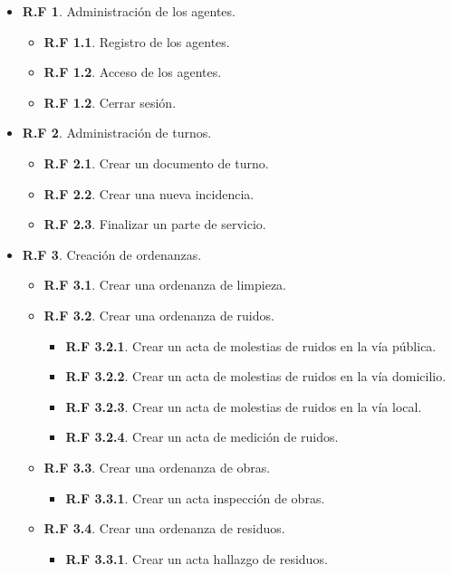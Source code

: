 \begin{itemize}
	
	\item \textbf{R.F 1}. Administración de los agentes.
	\begin{itemize}
		\item \textbf{R.F 1.1}. Registro de los agentes.
		\item \textbf{R.F 1.2}. Acceso de los agentes.
		\item \textbf{R.F 1.2}. Cerrar sesión.
	\end{itemize}

	\item \textbf{R.F 2}. Administración de turnos.
	\begin{itemize}
		\item \textbf{R.F 2.1}. Crear un documento de turno.
		\item \textbf{R.F 2.2}. Crear una nueva incidencia.
		\item \textbf{R.F 2.3}. Finalizar un parte de servicio.
	\end{itemize}

	\item \textbf{R.F 3}. Creación de ordenanzas.
	\begin{itemize}
		\item \textbf{R.F 3.1}. Crear una ordenanza de limpieza.
		\item \textbf{R.F 3.2}. Crear una ordenanza de ruidos.
		\begin{itemize}
			\item \textbf{R.F 3.2.1}. Crear un acta de molestias de ruidos en la vía pública.
			\item \textbf{R.F 3.2.2}. Crear un acta de molestias de ruidos en la vía domicilio.
			\item \textbf{R.F 3.2.3}. Crear un acta de molestias de ruidos en la vía local.
			\item \textbf{R.F 3.2.4}. Crear un acta de medición de ruidos.
		\end{itemize}
		\item \textbf{R.F 3.3}. Crear una ordenanza de obras.
		\begin{itemize}
			\item \textbf{R.F 3.3.1}. Crear un acta inspección de obras.
		\end{itemize}
		\item \textbf{R.F 3.4}. Crear una ordenanza de residuos.
		\begin{itemize}
			\item \textbf{R.F 3.3.1}. Crear un acta hallazgo de residuos.
		\end{itemize}
	\end{itemize}


\end{itemize}
